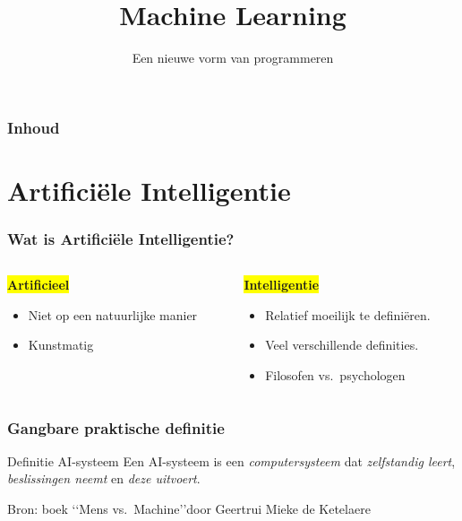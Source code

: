 \documentclass[aspectratio=169]{beamer}
\title{Machine Learning}
\subtitle{Een nieuwe vorm van programmeren}
\author{\lecturers}    %
\date{\academicyear}   %
\begin{document}
\begin{frame}
  \maketitle
\end{frame}

\begin{frame}
  \frametitle{Inhoud}

  \tableofcontents
\end{frame}

\section{Artifici\"ele Intelligentie}

\begin{frame}
\frametitle{Wat is Artifici\"ele Intelligentie?}
\begin{columns}
	\begin{column}{0.5\textwidth}
		\begin{center}
	\colorbox{yellow}{\Large{\textbf{Artificieel}}}
	\begin{itemize}
		\item Niet op een natuurlijke manier
		\item Kunstmatig
	\end{itemize}
	\end{center}
	\end{column}
	\begin{column}{0.5\textwidth}  %
		\begin{center}
			\colorbox{yellow}{\Large{\textbf{Intelligentie}}}
		\end{center}
	\begin{itemize}
		\item Relatief moeilijk te defini\"eren.
		\item Veel verschillende definities.
		\item Filosofen vs.\ psychologen
	\end{itemize}
	\end{column}
\end{columns}
\end{frame}

\begin{frame}
\frametitle{Gangbare praktische definitie}

\begin{block}{Definitie AI-systeem}
Een AI-systeem is een {\emph{computersysteem}} dat {\emph{zelfstandig leert}}, {\emph{beslissingen neemt}}
en {\emph{deze uitvoert}}.
\end{block}

Bron: boek \lq\lq Mens vs.\ Machine\rq\rq door Geertrui Mieke de Ketelaere	
\end{frame}
\end{document}
